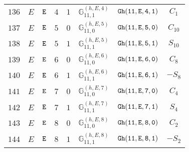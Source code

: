 \documentclass[fleqn,8pt]{jsarticle}
\begin{document}
\begin{table}[ht!]
\begin{center}
\begin{tabular}{cccccccc}
$ 136 $ & $ E $ & $ {\tt E} $ & $ 4 $ & $ 1 $ & $ \mathbb{G}_{11,1}^{(h,E,4)} $ & $ {\tt Gh(11,E,4,1)} $ & $ C_{1} $ \\
$ 137 $ & $ E $ & $ {\tt E} $ & $ 5 $ & $ 0 $ & $ \mathbb{G}_{11,0}^{(h,E,5)} $ & $ {\tt Gh(11,E,5,0)} $ & $ C_{10} $ \\
$ 138 $ & $ E $ & $ {\tt E} $ & $ 5 $ & $ 1 $ & $ \mathbb{G}_{11,1}^{(h,E,5)} $ & $ {\tt Gh(11,E,5,1)} $ & $ S_{10} $ \\
$ 139 $ & $ E $ & $ {\tt E} $ & $ 6 $ & $ 0 $ & $ \mathbb{G}_{11,0}^{(h,E,6)} $ & $ {\tt Gh(11,E,6,0)} $ & $ C_{8} $ \\
$ 140 $ & $ E $ & $ {\tt E} $ & $ 6 $ & $ 1 $ & $ \mathbb{G}_{11,1}^{(h,E,6)} $ & $ {\tt Gh(11,E,6,1)} $ & $ - S_{8} $ \\
$ 141 $ & $ E $ & $ {\tt E} $ & $ 7 $ & $ 0 $ & $ \mathbb{G}_{11,0}^{(h,E,7)} $ & $ {\tt Gh(11,E,7,0)} $ & $ C_{4} $ \\
$ 142 $ & $ E $ & $ {\tt E} $ & $ 7 $ & $ 1 $ & $ \mathbb{G}_{11,1}^{(h,E,7)} $ & $ {\tt Gh(11,E,7,1)} $ & $ S_{4} $ \\
$ 143 $ & $ E $ & $ {\tt E} $ & $ 8 $ & $ 0 $ & $ \mathbb{G}_{11,0}^{(h,E,8)} $ & $ {\tt Gh(11,E,8,0)} $ & $ C_{2} $ \\
$ 144 $ & $ E $ & $ {\tt E} $ & $ 8 $ & $ 1 $ & $ \mathbb{G}_{11,1}^{(h,E,8)} $ & $ {\tt Gh(11,E,8,1)} $ & $ - S_{2} $ \\
 \hline \hline
\end{tabular}
\end{center}
\end{table}
\end{document}
